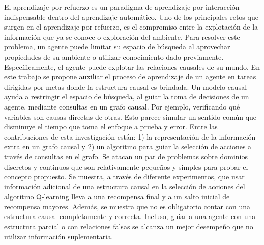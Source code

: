 
\begin{resumen}


El aprendizaje por refuerzo es un paradigma de aprendizaje por interacción indispensable dentro del aprendizaje automático. Uno de los principales retos que surgen en 
el aprendizaje por refuerzo, es el compromiso entre la 
explotación de la información que ya se conoce o 
exploración del ambiente. Para resolver este problema, 
un agente puede limitar su espacio de búsqueda al 
aprovechar propiedades de su ambiente o utilizar 
conocimiento dado previamente. Específicamente, el agente
puede explotar las relaciones causales de su mundo. En este
trabajo se propone auxiliar el proceso de aprendizaje de
un agente en tareas dirigidas por metas donde la estructura
causal es brindada. 
Un modelo causal ayuda a restringir el espacio de búsqueda, al
guiar la toma de decisiones de un agente, mediante consultas en un grafo causal. Por ejemplo, verificando qué variables 
son causas directas de otras.
Esto parece simular un sentido común que disminuye el
tiempo que toma el enfoque a prueba y error.
Entre las contribuciones de esta investigación están: 1)
la representación de la información extra en un grafo causal y 2) un algoritmo para guiar la selección de acciones 
a través de consultas en el grafo.
Se atacan un par de problemas sobre dominios discretos y continuos que son relativamente pequeños y simples para
probar el concepto propuesto.
Se muestra, a través de diferente experimentos, que
usar información adicional de una estructura causal
en la selección de acciones del algoritmo Q-learning
lleva a una recompensa final y a un salto inicial de
recompensa mayores. Además, se muestra que 
no es obligatorio contar con una estructura causal 
completamente y correcta. Incluso, guiar a una agente con una estructura parcial o con relaciones falsas se alcanza un mejor desempeño que no utilizar información suplementaria.

\end{resumen}